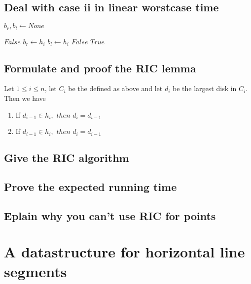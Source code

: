 \documentclass{article}
\begin{document}
\subsection{Deal with case ii in linear worstcase time}
\begin{algorithmic}[1]
		\State
		$b_r, b_l \gets None$

				\State
				\Return $False$
			\EndIf
			\State
			\State
				$b_r \gets h_i$
			\EndIf
			\State
				$b_l \gets h_i$
			\EndIf
				\State
				\Return $False$
			\EndIf
		\EndFor
		\State
		\Return $True$
	\EndFunction
\end{algorithmic}
\subsection{Formulate and proof the RIC lemma}
Let $1 \leq i \leq n$, let $C_i$ be the defined as above and let $d_i$ be
the largest disk in $C_i$. Then we have
\begin{enumerate}[i]
	\item If $d_{i-1} \in h_{i},$ $then$ $d_i = d_{i-1}$
	\item If $d_{i-1} \in h_{i},$ $then$ $d_i = d_{i-1}$
\end{enumerate}

\subsection{Give the RIC algorithm}

\subsection{Prove the expected running time}
\subsection{Eplain why you can't use RIC for points}
\section{A datastructure for horizontal line segments}
\end{document}
